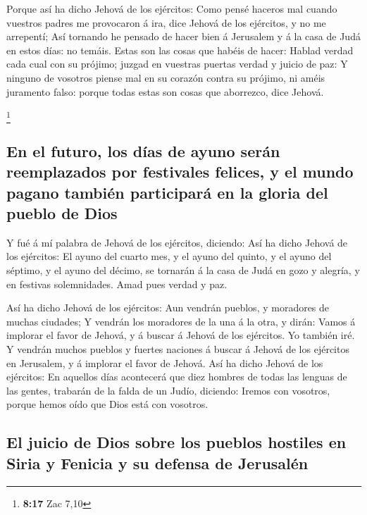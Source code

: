  Porque así ha dicho Jehová de los ejércitos: Como pensé
haceros mal cuando vuestros padres me provocaron á ira, dice Jehová de
los ejércitos, y no me arrepentí;  Así tornando he pensado
de hacer bien á Jerusalem y á la casa de Judá en estos días: no temáis.
 Estas son las cosas que habéis de hacer: Hablad verdad
cada cual con su prójimo; juzgad en vuestras puertas verdad y juicio de
paz:  Y ninguno de vosotros piense mal en su corazón contra
su prójimo, ni améis juramento falso: porque todas estas son cosas que
aborrezco, dice Jehová.

\footnote{\textbf{8:17} Zac 7,10}

\hypertarget{en-el-futuro-los-duxedas-de-ayuno-seruxe1n-reemplazados-por-festivales-felices-y-el-mundo-pagano-tambiuxe9n-participaruxe1-en-la-gloria-del-pueblo-de-dios}{%
\subsection{En el futuro, los días de ayuno serán reemplazados por
festivales felices, y el mundo pagano también participará en la gloria
del pueblo de
Dios}\label{en-el-futuro-los-duxedas-de-ayuno-seruxe1n-reemplazados-por-festivales-felices-y-el-mundo-pagano-tambiuxe9n-participaruxe1-en-la-gloria-del-pueblo-de-dios}}

 Y fué á mí palabra de Jehová de los ejércitos, diciendo:
 Así ha dicho Jehová de los ejércitos: El ayuno del cuarto
mes, y el ayuno del quinto, y el ayuno del séptimo, y el ayuno del
décimo, se tornarán á la casa de Judá en gozo y alegría, y en festivas
solemnidades. Amad pues verdad y paz.

 Así ha dicho Jehová de los ejércitos: Aun vendrán pueblos,
y moradores de muchas ciudades;  Y vendrán los moradores de
la una á la otra, y dirán: Vamos á implorar el favor de Jehová, y á
buscar á Jehová de los ejércitos. Yo también iré.  Y
vendrán muchos pueblos y fuertes naciones á buscar á Jehová de los
ejércitos en Jerusalem, y á implorar el favor de Jehová. 
Así ha dicho Jehová de los ejércitos: En aquellos días acontecerá que
diez hombres de todas las lenguas de las gentes, trabarán de la falda de
un Judío, diciendo: Iremos con vosotros, porque hemos oído que Dios está
con vosotros.

\hypertarget{el-juicio-de-dios-sobre-los-pueblos-hostiles-en-siria-y-fenicia-y-su-defensa-de-jerusaluxe9n}{%
\subsection{El juicio de Dios sobre los pueblos hostiles en Siria y
Fenicia y su defensa de
Jerusalén}\label{el-juicio-de-dios-sobre-los-pueblos-hostiles-en-siria-y-fenicia-y-su-defensa-de-jerusaluxe9n}}

